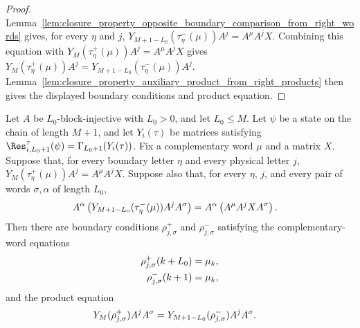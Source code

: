 \begin{proof}
    \leanok
    Lemma~\ref{lem:closure_property_opposite_boundary_comparison_from_right_words}
    gives, for every $\eta$ and $j$,
    $Y_{M+1-L_0}(\tau^-_\eta(\mu))A^j = A^\mu A^jX$.
    Combining this equation with
    $Y_M(\tau^+_\eta(\mu))A^j=A^\mu A^jX$ gives
    $Y_M(\tau^+_\eta(\mu))A^j = Y_{M+1-L_0}(\tau^-_\eta(\mu))A^j$.
    Lemma~\ref{lem:closure_property_auxiliary_product_from_right_products}
    then gives the displayed boundary conditions and product equation.
\end{proof}

\begin{lemma}
    \label{lem:closure_property_auxiliary_product_from_opposite_boundary_left_words}
    \leanok
    Let $A$ be $L_0$-block-injective with $L_0>0$, and let $L_0\le M$.
    Let $\psi$ be a state on the chain of length $M+1$, and let
    $Y_i(\tau)$ be matrices satisfying
    $\Res^{\tau}_{i,L_0+1}(\psi)=\Gamma_{L_0+1}(Y_i(\tau))$.
    Fix a complementary word $\mu$ and a matrix $X$. Suppose that, for every
    boundary letter $\eta$ and every physical letter $j$,
    $Y_M(\tau^+_\eta(\mu))A^j=A^\mu A^jX$.
    Suppose also that, for every $\eta$, $j$, and every pair of words
    $\sigma,\alpha$ of length $L_0$,
    \begin{align}
        A^\alpha
        \left(Y_{M+1-L_0}(\tau^-_\eta(\mu))A^jA^\sigma\right)
         & =
        A^\alpha\left(A^\mu A^jXA^\sigma\right).
        \notag
    \end{align}
    Then there are boundary conditions $\rho^+_{j,\sigma}$ and
    $\rho^-_{j,\sigma}$ satisfying the complementary-word equations
    \begin{align}
        \rho^+_{j,\sigma}(k+L_0)
         & =
        \mu_k,
        \notag \\
        \rho^-_{j,\sigma}(k+1)
         & =
        \mu_k,
        \notag
    \end{align}
    and the product equation
    \begin{align}
        Y_M(\rho^+_{j,\sigma})A^jA^\sigma
         & =
        Y_{M+1-L_0}(\rho^-_{j,\sigma})A^jA^\sigma.
        \notag
    \end{align}
\end{lemma}

